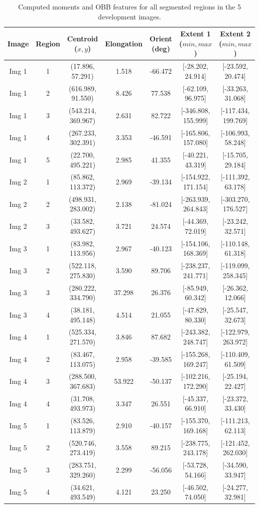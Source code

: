 \documentclass[11pt,letterpaper]{article}
\begin{document}
\begin{table}[H]
\centering
\small
\begin{tabular}{ccccccc}
\toprule
Image & Region & Centroid ($x, y$) & Elongation & Orient (deg) & Extent 1 ($min, max$) & Extent 2 ($min, max$) \\
\midrule
Img 1 & 1 & (17.896, 57.291) & 1.518 & -66.472 & [-28.202, 24.914] & [-23.592, 20.474] \\
Img 1 & 2 & (616.989, 91.550) & 8.426 & 77.538 & [-62.109, 96.975] & [-33.263, 31.068] \\
Img 1 & 3 & (543.214, 369.967) & 2.631 & 82.722 & [-346.808, 155.999] & [-117.434, 199.769] \\
Img 1 & 4 & (267.233, 302.391) & 3.353 & -46.591 & [-165.806, 157.080] & [-106.993, 58.248] \\
Img 1 & 5 & (22.700, 495.221) & 2.985 & 41.355 & [-40.221, 43.319] & [-15.705, 29.184] \\
\midrule
Img 2 & 1 & (85.862, 113.372) & 2.969 & -39.134 & [-154.922, 171.154] & [-111.392, 63.178] \\
Img 2 & 2 & (498.931, 283.002) & 2.138 & -81.024 & [-263.939, 264.843] & [-303.270, 176.527] \\
Img 2 & 3 & (33.582, 493.627) & 3.721 & 24.574 & [-44.369, 72.019] & [-23.242, 32.571] \\
\midrule
Img 3 & 1 & (83.982, 113.956) & 2.967 & -40.123 & [-154.106, 168.369] & [-110.148, 61.318] \\
Img 3 & 2 & (522.118, 275.830) & 3.590 & 89.706 & [-238.237, 241.771] & [-119.099, 258.345] \\
Img 3 & 3 & (280.222, 334.790) & 37.298 & 26.376 & [-85.949, 60.342] & [-26.362, 12.066] \\
Img 3 & 4 & (38.181, 495.148) & 4.514 & 21.055 & [-47.829, 80.330] & [-25.547, 32.673] \\
\midrule
Img 4 & 1 & (525.334, 271.570) & 3.846 & 87.682 & [-243.382, 248.747] & [-122.979, 263.972] \\
Img 4 & 2 & (83.467, 113.075) & 2.958 & -39.585 & [-155.268, 169.247] & [-110.409, 61.509] \\
Img 4 & 3 & (288.500, 367.683) & 53.922 & -50.137 & [-102.216, 172.290] & [-25.194, 22.427] \\
Img 4 & 4 & (31.708, 493.973) & 3.347 & 26.551 & [-45.337, 66.910] & [-23.372, 33.430] \\
\midrule
Img 5 & 1 & (83.526, 113.879) & 2.910 & -40.157 & [-155.370, 169.168] & [-111.213, 62.113] \\
Img 5 & 2 & (520.746, 273.419) & 3.558 & 89.215 & [-238.775, 243.178] & [-121.452, 262.030] \\
Img 5 & 3 & (283.751, 329.260) & 2.299 & -56.056 & [-53.728, 54.166] & [-34.590, 33.947] \\
Img 5 & 4 & (34.621, 493.549) & 4.121 & 23.250 & [-46.502, 74.050] & [-24.277, 32.981] \\
\bottomrule
\end{tabular}
\caption{Computed moments and OBB features for all segmented regions in the 5 development images.}
\label{tab:features}
\end{table}
\end{document}
